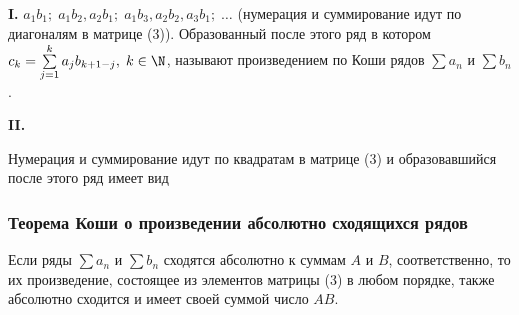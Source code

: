 \documentclass[a4paper]{article}
\begin{document}
\textbf{I.} $a_1b_1; \; a_1b_2,a_2b_1; \; a_1b_3,a_2b_2,a_3b_1; \;
\ldots$ (нумерация и суммирование идут по диагоналям в матрице (3)).
Образованный после этого ряд
 в котором $c_k=\sum\limits_{j=1}^k a_j b_{k+1-j}, \; k\in\N$,
называют произведением по Коши рядов $\sum a_n$ и $\sum b_n$.

\textbf{II.} 

Нумерация и суммирование идут по квадратам в матрице (3) и
образовавшийся после этого ряд имеет вид

\subsubsection{Теорема Коши о произведении абсолютно сходящихся
рядов}

\begin{theorem}
Если ряды $\sum a_n$ и $\sum b_n$ сходятся абсолютно к суммам $A$ и
$B$, соответственно, то их произведение, состоящее из элементов
матрицы (3) в любом порядке, также абсолютно сходится и имеет своей
суммой число $AB$.
\end{theorem}
\end{document}
